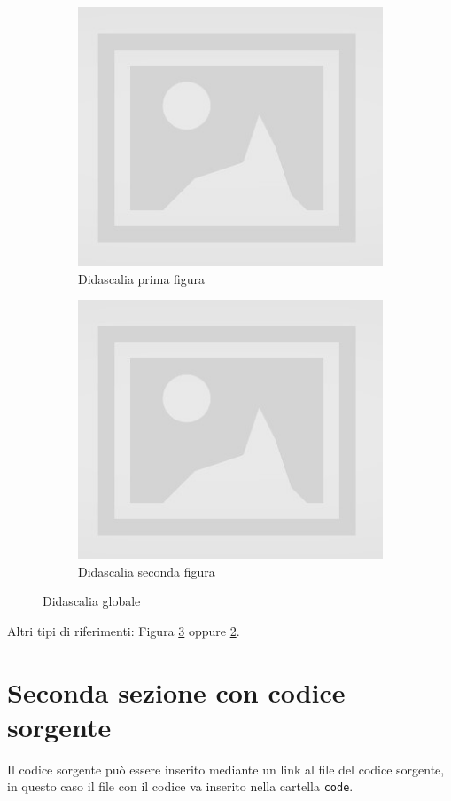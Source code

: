 \begin{figure}[H]
\centering
\begin{subfigure}[b]{0.42\textwidth}
\includegraphics[width=\textwidth]{images/placeholder.jpg}
\caption{Didascalia prima figura}
\label{fig:figure2}
\end{subfigure}
\qquad
\begin{subfigure}[b]{0.42\textwidth}
\includegraphics[width=\textwidth]{images/placeholder.jpg}
\caption{Didascalia seconda figura}
\label{fig:figure3}
\end{subfigure}
\caption{Didascalia globale}
\label{fig:figures12}
\end{figure}

Altri tipi di riferimenti: Figura \ref{fig:figures12} oppure \ref{fig:figure3}.

\section{Seconda sezione con codice sorgente}

Il codice sorgente può essere inserito mediante un link al file del codice sorgente, in questo caso il file con il codice va inserito nella cartella \texttt{code}.
